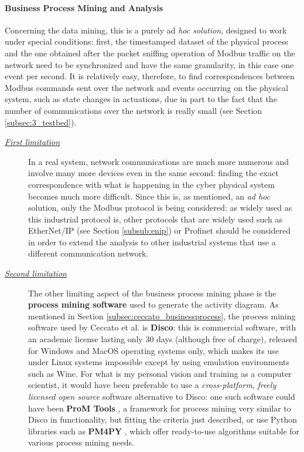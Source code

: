 \paragraph{Business Process Mining and Analysis}
\label{par:3_processmining_limitations}
Concerning the data mining, this is a purely ad \textit{hoc solution}, designed to work under special conditions: first, the timestamped dataset of the physical process and the one obtained after the packet sniffing operation of Modbus traffic on the network need to be synchronized and have the same granularity, in this case one event per second.\newline
It is relatively easy, therefore, to find correspondences between Modbus commands sent over the network and events occurring on the physical system, such as state changes in actuations, due in part to the fact that the number of communications over the network is really small (see Section \ref{subsec:3_testbed}).

\begin{description}
	\item[\emph{\underline{First limitation}}] In a real system, network communications are much more numerous and involve many more devices even in the same second: finding the exact correspondence with what is happening in the cyber physical system becomes much more difficult.\newline
	Since this is, as mentioned, an \textit{ad hoc} solution, only the Modbus protocol is being considered: as widely used as this industrial protocol is, other protocols that are widely used \cite{protocols_market_shares} such as EtherNet/IP (see Section \ref{subsub:enip}) or Profinet should be considered in order to extend the analysis to other industrial systems that use a different communication network.
	
	\item[\emph{\underline{Second limitation}}] The other limiting aspect of the business process mining phase is the \textbf{process mining software} used to generate the activity diagram. As mentioned in Section \ref{subsec:ceccato_businessprocess}, the process mining software used by Ceccato et al. is \textbf{Disco}: this is commercial software, with an academic license lasting only 30 days (although free of charge), released for Windows and MacOS operating systems only, which makes its use under Linux systems impossible except by using emulation environments such as Wine.\newline
	For what is my personal vision and training as a computer scientist, it would have been preferable to use a \textit{cross-platform}, \textit{freely licensed open source} software alternative to Disco: one such software could have been \textbf{ProM Tools} \cite{prom_tools}, a framework for process mining very similar to Disco in functionality, but fitting the criteria just described, or use Python libraries such as \textbf{PM4PY} \cite{pm4py}, which offer ready-to-use algorithms suitable for various process mining needs.
\end{description}
\vfill

